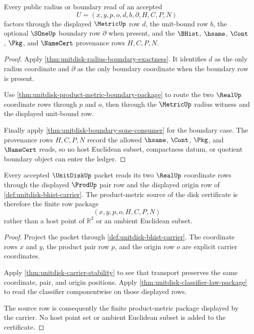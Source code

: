 \begin{theorem}
\label{thm:unitdisk-radius-ledger-exactness}
Every public radius or boundary read of an accepted
$$
U=(x,y,p,o,d,b,\partial,H,C,P,N)
$$
factors through the displayed $\MetricUp$ row $d$, the unit-bound row $b$, the optional $\SOneUp$ boundary row $\partial$ when present, and the $\BHist$, $\hsame$, $\Cont$, $\Pkg$, and $\NameCert$ provenance rows $H,C,P,N$.
\end{theorem}
\begin{proof}
Apply \autoref{thm:unitdisk-radius-boundary-exactness}. It identifies $d$ as the only radius coordinate and $\partial$ as the only boundary coordinate when the boundary row is present.

Use \autoref{thm:unitdisk-product-metric-boundary-package} to route the two $\RealUp$ coordinate rows through $p$ and $o$, then through the $\MetricUp$ radius witness and the displayed unit-bound row.

Finally apply \autoref{thm:unitdisk-boundary-sone-consumer} for the boundary case. The provenance rows $H,C,P,N$ record the allowed $\hsame$, $\Cont$, $\Pkg$, and $\NameCert$ reads, so no host Euclidean subset, compactness datum, or quotient boundary object can enter the ledger.
\end{proof}

\begin{theorem}
\label{thm:unitdisk-scoped-product-metric-source}
Every accepted $\UnitDiskUp$ packet reads its two $\RealUp$ coordinate rows through the displayed $\ProdUp$ pair row and the displayed origin row of \autoref{def:unitdisk-bhist-carrier}. The product-metric source of the disk certificate is therefore the finite row package
$$
(x,y,p,o,H,C,P,N)
$$
rather than a host point of $\mathbb{R}^2$ or an ambient Euclidean subset.
\end{theorem}
\begin{proof}
Project the packet through \autoref{def:unitdisk-bhist-carrier}. The coordinate rows $x$ and $y$, the product pair row $p$, and the origin row $o$ are explicit carrier coordinates.

Apply \autoref{thm:unitdisk-carrier-stability} to see that transport preserves the same coordinate, pair, and origin positions. Apply \autoref{thm:unitdisk-classifier-law-package} to read the classifier componentwise on those displayed rows.

The source row is consequently the finite product-metric package displayed by the carrier. No host point set or ambient Euclidean subset is added to the certificate.
\end{proof}

